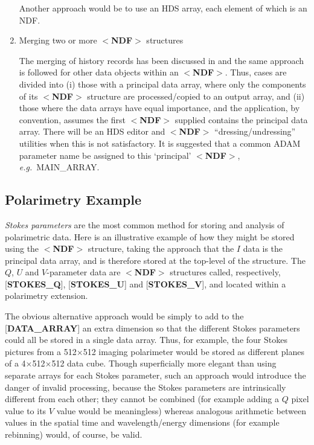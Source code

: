 \documentclass[twoside,11pt,nolof,noabs]{starlink}
\begin{document}
\begin{enumerate}
\begin{latexonly}
\begin{tabbing}
\end{tabbing}
\end{latexonly}




Another approach would be to use an HDS array, each
element of which is an NDF.

\item Merging two or more $<$\textbf{NDF}$>$ structures

The merging of history records has been discussed
in  and the same approach
is followed for other data objects within an $<$\textbf{NDF}$>$.
Thus, cases are divided into (i)
those with a principal data array, where only the
components of its $<$\textbf{NDF}$>$ structure are
processed/copied to an output array, and
(ii) those where the
data arrays have equal importance, and
the application, by convention, assumes the first $<$\textbf{NDF}$>$ supplied
contains the
principal data array.  There will be an HDS editor and $<$\textbf{NDF}$>$
``dressing/undressing'' utilities when this is not satisfactory.  It is
suggested that a common {\small ADAM} parameter name be assigned to this `principal'
$<$\textbf{NDF}$>$, \textit{e.g.}\  MAIN\_ARRAY.
\end{enumerate}

\subsection{Polarimetry Example\label{se:expolarimetry}}

\textit{Stokes parameters} are the most common method for storing and analysis
of polarimetric data.  Here is an illustrative
example of how they might be stored
using the $<$\textbf{NDF}$>$ structure, taking the approach that
the $I$ data is the principal data array, and is therefore
stored at the top-level of the structure.  The $Q$, $U$ and $V$-parameter data
are $<$\textbf{NDF}$>$ structures called, respectively,
{[}\textbf{STOKES\_Q}{]}, {[}\textbf{STOKES\_U}{]}
and {[}\textbf{STOKES\_V}{]}, and
located within a polarimetry extension.

The obvious alternative approach would be simply to
add to the {[}\textbf{DATA\_ARRAY}{]} an extra dimension so that
the different Stokes parameters could all be stored in a
single data array.  Thus, for example, the four Stokes pictures from a
512$\times$512 imaging polarimeter would be stored as different planes of a
4$\times$512$\times$512 data cube.
Though superficially more elegant than using
separate arrays for each Stokes parameter, such
an approach would introduce the danger
of invalid processing, because the Stokes
parameters are intrinsically different from each other; they cannot
be combined (for example adding a $Q$ pixel
value to its $V$ value would be meaningless)
whereas analogous arithmetic between values in the spatial
time and wavelength/energy dimensions (for example rebinning)
would, of course, be valid.
\end{document}
